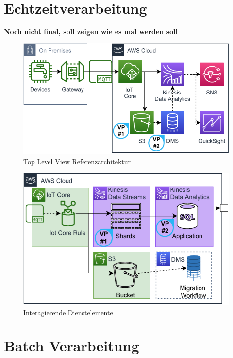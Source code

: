 \section{Echtzeitverarbeitung}
\textbf{Noch nicht final, soll zeigen wie es mal werden soll}
\begin{figure}[H]
\centering
\includegraphics[width=\textwidth]{graphics/Echtzeit-RA-Overview.pdf}
\caption{Top Level View Referenzarchitektur}
\label{abb:TopLevelEchtzeitRA}
\end{figure}

\begin{figure}[H]
\centering
\includegraphics[height=0.33\textheight]{graphics/Echtzeit-RA-Elements.pdf}
\caption{Interagierende Dienstelemente}
\label{abb:ElementeEchtzeitRA}
\end{figure}



\section{Batch Verarbeitung}



